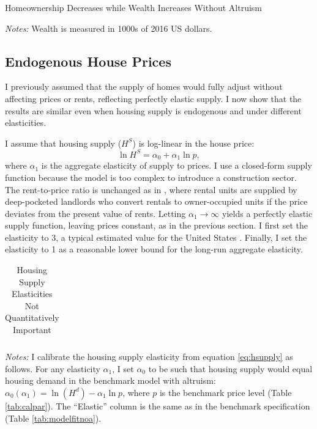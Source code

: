 \documentclass[12pt]{article}
\begin{document}
\begin{table}
	\center 
	\begin{threeparttable}
		\caption{Homeownership Decreases while Wealth Increases Without Altruism}\label{tab:modelfitnoa}
		
		\footnotesize
		\textit{Notes:} Wealth is measured in 1000s of 2016 US dollars.
	\end{threeparttable}
\end{table}

\subsection{Endogenous House Prices}\label{sec:endoprice}
I previously assumed that the supply of homes would fully adjust without affecting prices or rents, reflecting perfectly elastic supply. I now show that the results are similar even when housing supply is endogenous and under different elasticities.

I assume that housing supply ($H^S$) is log-linear in the house price:
\begin{equation}
\label{eq:hsupply}
\ln H^S = \alpha_0 + \alpha_1 \ln p,
\end{equation}
where $\alpha_1$ is the aggregate elasticity of supply to prices. I use a closed-form supply function because the model is too complex to introduce a construction sector. The rent-to-price ratio is unchanged as in \cite{Kaplan2020}, where rental units are supplied by deep-pocketed landlords who convert rentals to owner-occupied units if the price deviates from the present value of rents. Letting $\alpha_1\to\infty$ yields a perfectly elastic supply function, leaving prices constant, as in the previous section. I first set the elasticity to 3, a typical estimated value for the United States \cite[see e.g.,][]{saiz2010geographic,aastveit2023changing}. Finally, I  set the elasticity to 1 as a reasonable lower bound for the long-run aggregate elasticity.

\begin{table}
	\center  
	\begin{threeparttable}
		\caption{Housing Supply Elasticities Not Quantitatively Important}\label{tab:quant_endogenprices}
		
		\begin{tabular}{@{}llll@{}}
			
		\end{tabular}
		
		\footnotesize
				\textit{Notes:} I calibrate the housing supply elasticity from equation \eqref{eq:hsupply} as follows. For any elasticity $\alpha_1$, I set $\alpha_0$ to be such that housing supply would equal housing demand in the benchmark model with altruism: $\alpha_0(\alpha_1) = \ln(H^d) - \alpha_1 \ln p$, where $p$ is the benchmark price level (Table \ref{tab:calpar}). The ``Elastic'' column is the same as in the benchmark specification (Table \ref{tab:modelfitnoa}).
	\end{threeparttable}
\end{table}
\end{document}
